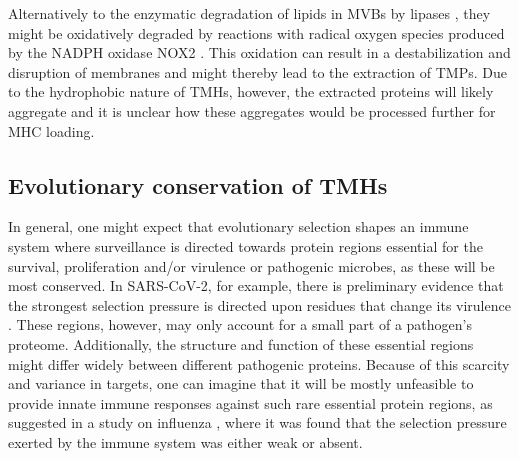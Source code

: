 Alternatively to the enzymatic degradation of lipids in MVBs by lipases \cite{sander2016lipase,gilleron2016lysosomal}, 
they might be oxidatively degraded by reactions with radical oxygen species produced by the NADPH oxidase NOX2 \cite{dingjan2016lipid}. 
This oxidation can result in a destabilization and disruption of membranes \cite{dingjan2016lipid} 
and might thereby lead to the extraction of TMPs. 
Due to the hydrophobic nature of TMHs, 
however, the extracted proteins will likely aggregate 
and it is unclear how these aggregates would be processed further for MHC loading. 


\subsection{Evolutionary conservation of TMHs}

 
In general, one might expect that evolutionary selection shapes an immune system 
where surveillance is directed towards protein regions 
essential for the survival, proliferation and/or virulence or pathogenic microbes, 
as these will be most conserved.
In SARS-CoV-2, for example, there is preliminary evidence that the strongest
selection pressure is directed upon residues that change its 
virulence \cite{velazquez2020positive}.
These regions, however, may only account for a small part of a pathogen's proteome.
Additionally, the structure and function of these essential regions might differ widely between different pathogenic proteins.
Because of this scarcity and variance in targets, 
one can imagine that it will be mostly unfeasible 
to provide innate immune responses against such rare essential protein regions, 
as suggested in a study on influenza \cite{han2019individual},
where it was found that the selection pressure
exerted by the immune system was either weak or absent.
 

